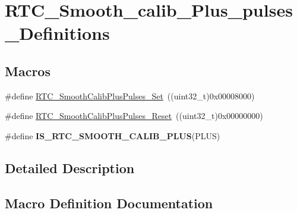 \hypertarget{group___r_t_c___smooth__calib___plus__pulses___definitions}{}\section{R\+T\+C\+\_\+\+Smooth\+\_\+calib\+\_\+\+Plus\+\_\+pulses\+\_\+\+Definitions}
\label{group___r_t_c___smooth__calib___plus__pulses___definitions}
\subsection*{Macros}
\begin{DoxyCompactItemize}
\item 
\#define \hyperlink{group___r_t_c___smooth__calib___plus__pulses___definitions_ga48a2b554e653139e8fda1d4ffd470144}{R\+T\+C\+\_\+\+Smooth\+Calib\+Plus\+Pulses\+\_\+\+Set}~((uint32\+\_\+t)0x00008000)
\item 
\#define \hyperlink{group___r_t_c___smooth__calib___plus__pulses___definitions_ga13d843306f6d3cd22e2443f45f191fe8}{R\+T\+C\+\_\+\+Smooth\+Calib\+Plus\+Pulses\+\_\+\+Reset}~((uint32\+\_\+t)0x00000000)
\item 
\#define {\bfseries I\+S\+\_\+\+R\+T\+C\+\_\+\+S\+M\+O\+O\+T\+H\+\_\+\+C\+A\+L\+I\+B\+\_\+\+P\+L\+U\+S}(P\+L\+U\+S)
\end{DoxyCompactItemize}


\subsection{Detailed Description}


\subsection{Macro Definition Documentation}
\hypertarget{group___r_t_c___smooth__calib___plus__pulses___definitions_gad0081b479cf6d71ac588a483d09d7b75}{}
